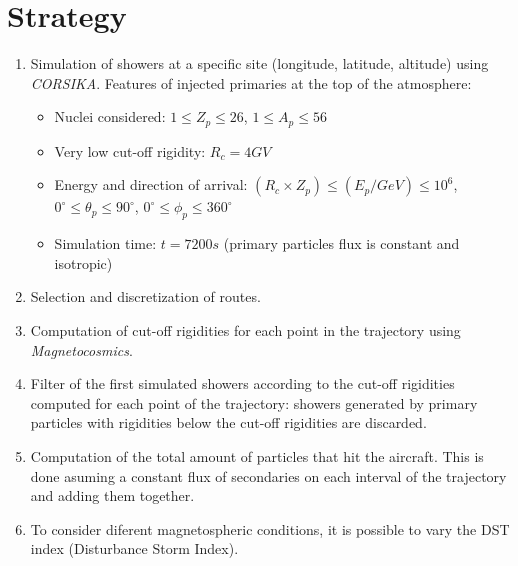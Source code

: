 \documentclass[3p,times,twocolumn]{elsarticle}
\begin{document}
\section{Strategy}
\label{sec:strategy}
\begin{enumerate}[leftmargin=*]
\item Simulation of showers at a specific site (longitude, latitude, altitude) using \textit{CORSIKA}. Features of injected primaries at the top of the atmosphere:
\begin{itemize}[leftmargin=*]
\item Nuclei considered: $1\leq Z_p\leq 26$, $1\leq A_p\leq 56$
\item  Very low cut-off rigidity: $R_c=4GV$
\item Energy and direction of arrival: $(R_c\times Z_p)\leq (E_p/GeV)\leq 10^6$, $0^\circ\leq\theta_p\leq 90^\circ$, $0^\circ\leq\phi_p\leq 360^\circ$
\item Simulation time: $t=7200 s$ (primary particles flux is constant and isotropic)
\end{itemize}
\item Selection and discretization of routes.
\item Computation of cut-off rigidities for each point in the trajectory using \textit{Magnetocosmics}.
\item Filter of the first simulated showers according to the cut-off rigidities computed for each point of the trajectory: showers generated by primary particles with rigidities below the cut-off rigidities are discarded.
\item Computation of the total amount of particles that hit the aircraft. This is done asuming a constant flux of secondaries on each interval of the trajectory and adding them together.
\item To consider diferent magnetospheric conditions, it is possible to vary the DST index (Disturbance Storm Index).
\end{enumerate}
\end{document}
